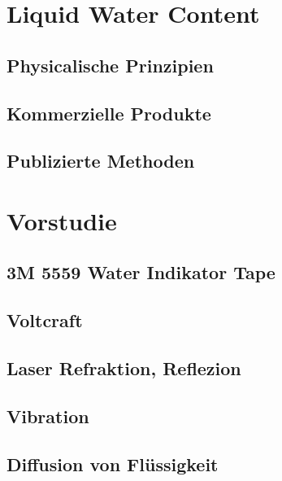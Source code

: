 \documentclass[a4paper,12pt]{article}
\begin{document}
\section{Liquid Water Content}
\subsection{Physicalische Prinzipien}

\subsection{Kommerzielle Produkte}

\subsection{Publizierte Methoden}


\section{Vorstudie}

\subsection{3M 5559 Water Indikator Tape}


\subsection{Voltcraft}


\subsection{Laser Refraktion, Reflezion}


\subsection{Vibration}


\subsection{Diffusion von Flüssigkeit}

\end{document}
